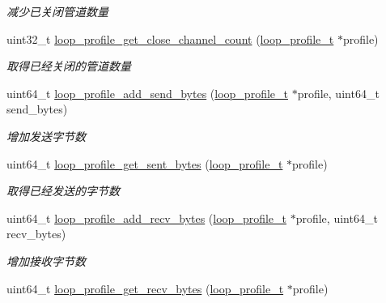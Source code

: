 \begin{DoxyCompactItemize}
\begin{DoxyCompactList}\small\item\em 减少已关闭管道数量 \end{DoxyCompactList}\item 
uint32\+\_\+t \hyperlink{a00077_a5fd58f572ac680a32930d275c5854e8e_a5fd58f572ac680a32930d275c5854e8e}{loop\+\_\+profile\+\_\+get\+\_\+close\+\_\+channel\+\_\+count} (\hyperlink{a00050_ad060e1396346d2f5db1ec0597376a107_ad060e1396346d2f5db1ec0597376a107}{loop\+\_\+profile\+\_\+t} $\ast$profile)
\begin{DoxyCompactList}\small\item\em 取得已经关闭的管道数量 \end{DoxyCompactList}\item 
uint64\+\_\+t \hyperlink{a00077_a04e566a4074bb91aa86119c34157c440_a04e566a4074bb91aa86119c34157c440}{loop\+\_\+profile\+\_\+add\+\_\+send\+\_\+bytes} (\hyperlink{a00050_ad060e1396346d2f5db1ec0597376a107_ad060e1396346d2f5db1ec0597376a107}{loop\+\_\+profile\+\_\+t} $\ast$profile, uint64\+\_\+t send\+\_\+bytes)
\begin{DoxyCompactList}\small\item\em 增加发送字节数 \end{DoxyCompactList}\item 
uint64\+\_\+t \hyperlink{a00077_ad8eec173abe7c0e50137b6ac74c2c817_ad8eec173abe7c0e50137b6ac74c2c817}{loop\+\_\+profile\+\_\+get\+\_\+sent\+\_\+bytes} (\hyperlink{a00050_ad060e1396346d2f5db1ec0597376a107_ad060e1396346d2f5db1ec0597376a107}{loop\+\_\+profile\+\_\+t} $\ast$profile)
\begin{DoxyCompactList}\small\item\em 取得已经发送的字节数 \end{DoxyCompactList}\item 
uint64\+\_\+t \hyperlink{a00077_ac826bfebabc5f965c6906ce83400f1de_ac826bfebabc5f965c6906ce83400f1de}{loop\+\_\+profile\+\_\+add\+\_\+recv\+\_\+bytes} (\hyperlink{a00050_ad060e1396346d2f5db1ec0597376a107_ad060e1396346d2f5db1ec0597376a107}{loop\+\_\+profile\+\_\+t} $\ast$profile, uint64\+\_\+t recv\+\_\+bytes)
\begin{DoxyCompactList}\small\item\em 增加接收字节数 \end{DoxyCompactList}\item 
uint64\+\_\+t \hyperlink{a00077_aabcce950d0234d7dab3740e97f914c95_aabcce950d0234d7dab3740e97f914c95}{loop\+\_\+profile\+\_\+get\+\_\+recv\+\_\+bytes} (\hyperlink{a00050_ad060e1396346d2f5db1ec0597376a107_ad060e1396346d2f5db1ec0597376a107}{loop\+\_\+profile\+\_\+t} $\ast$profile)

\end{DoxyCompactItemize}
